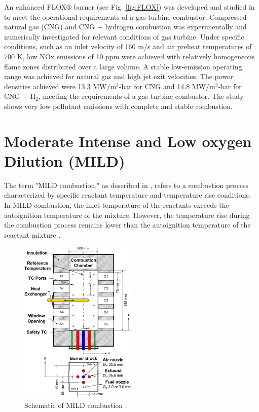 An enhanced FLOX® burner (see Fig. \ref{fig:FLOX}) was developed and studied in \cite{LAMMEL4001825} to meet the operational requirements of a gas turbine combustor. Compressed natural gas (CNG) and CNG + hydrogen combustion was experimentally and numerically investigated for relevant conditions of gas turbine. Under specific conditions, such as an inlet velocity of 160 m/s and air preheat temperatures of 700 K, low NOx emissions of 10 ppm were achieved with relatively homogeneous flame zones distributed over a large volume. A stable low-emission operating range was achieved for natural gas and high jet exit velocities.  The power densities achieved were 13.3 MW/m$^3$-bar for CNG and 14.8 MW/m$^3$-bar for CNG + H$_2$, meeting the requirements of a gas turbine combustor\cite{doi:10.1021/ef402357t}. The study shows very low pollutant emissions with complete and stable combustion.

\section{Moderate Intense and Low oxygen Dilution (MILD)}

The term "MILD combustion," as described in \cite{CAVALIERE2004329}, refers to a combustion process characterized by specific reactant temperature and temperature rise conditions. In MILD combustion, the inlet temperature of the reactants exceeds the autoignition temperature of the mixture. However, the temperature rise during the combustion process remains lower than the autoignition temperature of the reactant mixture \cite{doi:10.1021/acs.energyfuels.7b03607}.

\begin{figure}
    \centering
    \includegraphics[width=0.5\textwidth]{Chapter2/Images/MILD.jpg}
    \caption[Schematic of MILD combustion]{Schematic of MILD combustion \cite{SZEGO2009429}.}
    \label{fig:MILD}
\end{figure}

